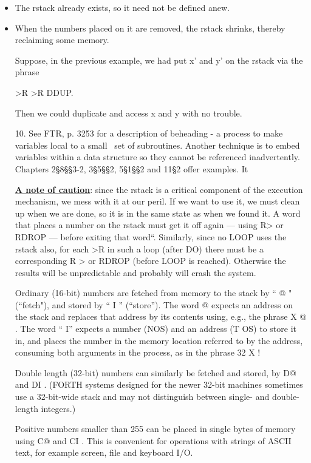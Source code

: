 \begin{itemize}
	\item The rstack already exists, so it need not be deﬁned anew.
	\item When the numbers placed on it are removed, the rstack shrinks, thereby reclaiming some memory.

Suppose, in the previous example, we had put x’ and y’ on the rstack via the phrase

>R >R DDUP.

Then we could duplicate and access x and y with no trouble.

10. See FTR, p. 3253 for a description of beheading - a process to make variables local to a small \ set of subroutines. Another technique is to embed variables within a data structure so they cannot be referenccd inadvertently. Chapters 2§8§§3-2, 3§5§§2, 5§1§§2 and 11§2 offer examples. It

\underline{\textbf{A note of caution}}: since the rstack is a critical component of the execution mechanism, we mess with it at our peril. If we want to use it, we must clean up when we are done, so it is in the same state as when we found it. A word that places a number on the rstack must get it off again — using R> or RDROP — before exiting that word“. Similarly, since no LOOP uses the rstack also, for each >R in such a loop (after DO) there must be a corresponding R > or RDROP (before LOOP is reached). Otherwise the results will be unpredictable and probably will crash the system.


Ordinary (16-bit) numbers are fetched from memory to the stack by “ @ " (“fetch"), and stored by “ I ” (“store”). The word @ expects an address on the stack and replaces that address by its contents using, e.g., the phrase X @ . The word “ I” expects a number (NOS) and an address (T OS) to store it in, and places the number in the memory location referred to by the address, consuming both arguments in the process, as in the phrase 32 X !

Double length (32-bit) numbers can similarly be fetched and stored, by D@ and DI . (FORTH systems designed for the newer 32-bit machines sometimes use a 32-bit-wide stack and may not distinguish between single- and double-length integers.)

Positive numbers smaller than 255 can be placed in single bytes of memory using C@ and CI . This is convenient for operations with strings of ASCII text, for example screen, ﬁle and keyboard I/O.


\end{itemize}
